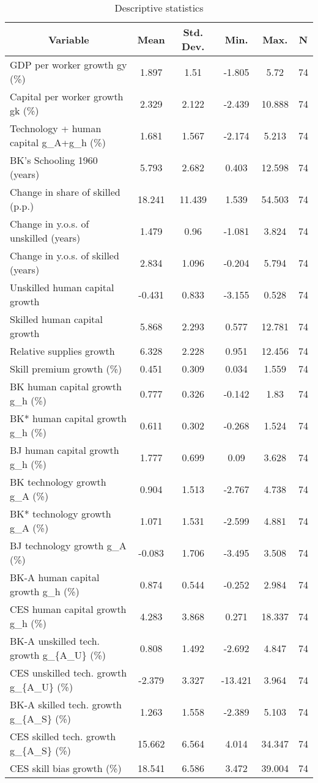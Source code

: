
\begin{table}[htbp]\centering \caption{Descriptive statistics \label{descstat}}
\begin{tabular}{l c c c c c}\hline\hline
\multicolumn{1}{c}{\textbf{Variable}} & \textbf{Mean}
 & \textbf{Std. Dev.}& \textbf{Min.} &  \textbf{Max.} & \textbf{N}\\ \hline
GDP per worker growth gy (\%) & 1.897 & 1.51 & -1.805 & 5.72 & 74\\
Capital per worker growth gk (\%) & 2.329 & 2.122 & -2.439 & 10.888 & 74\\
Technology + human capital g\_A+g\_h (\%) & 1.681 & 1.567 & -2.174 & 5.213 & 74\\
BK's Schooling 1960 (years) & 5.793 & 2.682 & 0.403 & 12.598 & 74\\
Change in share of skilled (p.p.) & 18.241 & 11.439 & 1.539 & 54.503 & 74\\
Change in y.o.s. of unskilled (years) & 1.479 & 0.96 & -1.081 & 3.824 & 74\\
Change in y.o.s. of skilled (years) & 2.834 & 1.096 & -0.204 & 5.794 & 74\\
Unskilled human capital growth & -0.431 & 0.833 & -3.155 & 0.528 & 74\\
Skilled human capital growth & 5.868 & 2.293 & 0.577 & 12.781 & 74\\
Relative supplies growth & 6.328 & 2.228 & 0.951 & 12.456 & 74\\
Skill premium growth (\%) & 0.451 & 0.309 & 0.034 & 1.559 & 74\\
BK human capital growth g\_h (\%) & 0.777 & 0.326 & -0.142 & 1.83 & 74\\
BK* human capital growth g\_h (\%) & 0.611 & 0.302 & -0.268 & 1.524 & 74\\
BJ human capital growth g\_h (\%) & 1.777 & 0.699 & 0.09 & 3.628 & 74\\
BK technology growth g\_A (\%) & 0.904 & 1.513 & -2.767 & 4.738 & 74\\
BK* technology growth g\_A (\%) & 1.071 & 1.531 & -2.599 & 4.881 & 74\\
BJ technology growth g\_A (\%) & -0.083 & 1.706 & -3.495 & 3.508 & 74\\
BK-A human capital growth g\_h (\%) & 0.874 & 0.544 & -0.252 & 2.984 & 74\\
CES human capital growth g\_h (\%) & 4.283 & 3.868 & 0.271 & 18.337 & 74\\
BK-A unskilled tech. growth g\_\{A\_U\} (\%) & 0.808 & 1.492 & -2.692 & 4.847 & 74\\
CES unskilled tech. growth g\_\{A\_U\} (\%) & -2.379 & 3.327 & -13.421 & 3.964 & 74\\
BK-A skilled tech. growth g\_\{A\_S\} (\%) & 1.263 & 1.558 & -2.389 & 5.103 & 74\\
CES skilled tech. growth g\_\{A\_S\} (\%) & 15.662 & 6.564 & 4.014 & 34.347 & 74\\
CES skill bias growth (\%) & 18.541 & 6.586 & 3.472 & 39.004 & 74\\
\hline\end{tabular}
\end{table}
